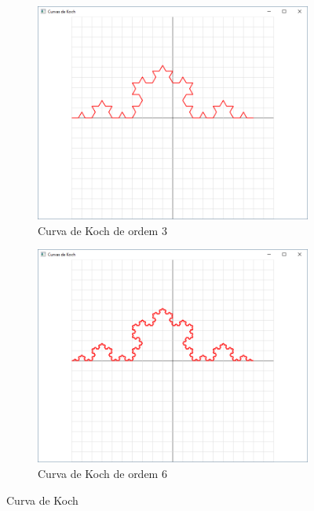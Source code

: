 \begin{enumerate}
\begin{enumerate}
\begin{figure}[!htp]
          \begin{subfigure}[t]{0.4\textwidth}
              \centerline{\includegraphics[width=.9\textwidth]{img/cap4_ex14c}}
              \caption{Curva de Koch de ordem $3$}
              \label{fig:cap03_ex14c}
          \end{subfigure}
          \hfill
          \begin{subfigure}[t]{0.4\textwidth}
              \centerline{\includegraphics[width=.9\textwidth]{img/cap4_ex14d}}
              \caption{Curva de Koch de ordem $6$}
              \label{fig:cap03_ex14d}
          \end{subfigure}
          
          \caption{
            \label{fig:koch}%
            Curva de Koch
          }


\end{figure}
\end{enumerate}
\end{enumerate}
